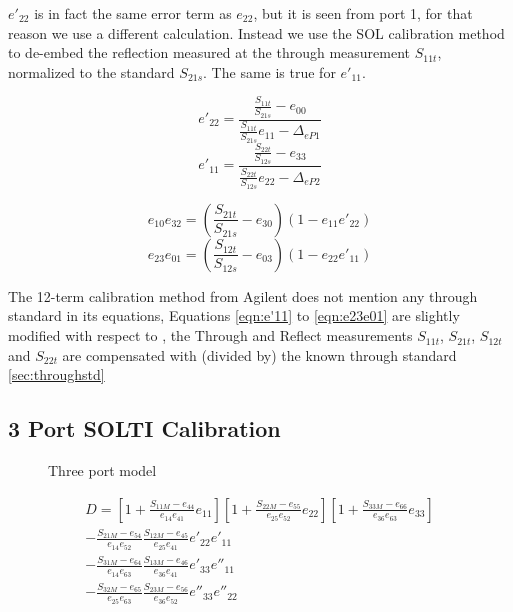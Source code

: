 $e'_{22}$ is in fact the same error term as $e_{22}$, but it is seen from port 1, for that reason we use a different calculation. Instead we use the SOL calibration method to de-embed the reflection measured at the through measurement $S_{11t}$, normalized to the standard $S_{21s}$. The same is true for $e'_{11}$. 

\begin{equation}
\label{eqn:e'22}
e'_{22} = \frac{\frac{S_{11t}}{S_{21s}}-e_{00}}{\frac{S_{11t}}{S_{21s}}e_{11}-\Delta_{eP1}}
\end{equation}
\begin{equation}
\label{eqn:e'11}
e'_{11} = \frac{\frac{S_{22t}}{S_{12s}}-e_{33}}{\frac{S_{22t}}{S_{12s}}e_{22}-\Delta_{eP2}}
\end{equation}

\begin{equation}
\label{eqn:e10e32}
e_{10}e_{32} = \left(\frac{S_{21t}}{S_{21s}} - e_{30}\right)\left(1-e_{11}e'_{22}\right)
\end{equation}
\begin{equation}
\label{eqn:e23e01}
e_{23}e_{01} = \left(\frac{S_{12t}}{S_{12s}} - e_{03}\right)\left(1-e_{22}e'_{11}\right)
\end{equation}

The 12-term calibration method from Agilent \cite{agilent_calibration} does not mention any through standard in its equations, Equations \ref{eqn:e'11} to \ref{eqn:e23e01} are slightly modified with respect to \cite{agilent_calibration}, the Through and Reflect measurements $S_{11t}$, $S_{21t}$, $S_{12t}$ and $S_{22t}$ are compensated with (divided by) the known through standard \ref{sec:throughstd}
\newpage
\subsection{3 Port SOLTI Calibration}
\label{sec:3psoltical}

\begin{figure}[H]
	\centering
	
	\caption{Three port model}
	\label{fig:threeportmodel}
\end{figure}
\begin{equation}
\begin{split}
D = \left[1+\frac{S_{11M}-e_{44}}{e_{14}e_{41}}e_{11}\right]
\left[1+\frac{S_{22M}-e_{55}}{e_{25}e_{52}}e_{22}\right]
\left[1+\frac{S_{33M}-e_{66}}{e_{36}e_{63}}e_{33}\right] \\
-\frac{S_{21M}-e_{54}}{e_{14}e_{52}}
\frac{S_{12M}-e_{45}}{e_{25}e_{41}}
e'_{22}e'_{11} \\
-\frac{S_{31M}-e_{64}}{e_{14}e_{63}}
\frac{S_{13M}-e_{46}}{e_{36}e_{41}}
e'_{33}e''_{11} \\
-\frac{S_{32M}-e_{65}}{e_{25}e_{63}}
\frac{S_{23M}-e_{56}}{e_{36}e_{52}}
e''_{33}e''_{22}
\end{split}
\end{equation}

